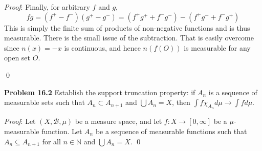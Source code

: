 \documentclass[12pt]{article}
\newcommand{\problem}[1]{\hspace{-4 ex} \large \textbf{Problem #1} }
\renewenvironment{proof}{\hspace{-4 ex} \emph{Proof}:}{\qed}
\newcommand{\NN}{\mathbb{N}}
\newcommand{\BB}{\mathcal{B}}
\begin{document}
\begin{proof}
	Finally, for arbitrary $f$ and $g$, 
	$$
	fg = (f^+ - f^-)(g^+ - g^-) = (f^+g^+ + f^-g^-) - (f^+g^- + f^-g^+)
	$$
	This is simply the finite sum of products of non-negative functions and is thus measurable. There is the small issue of the subtraction. That is easily overcome since $n(x)=-x$ is continuous, and hence $n(f(O))$ is measurable for any open set $O$. 
	
\end{proof}


\bigbreak
\problem{16.2} Establish the support truncation property: if $A_n$ is a sequence of measurable sets such that $A_n\subset A_{n+1}$ and $\bigcup A_n=X$, then $\int f\chi_{A_n} d\mu\to\int f d\mu$.
\bigbreak

\begin{proof}
	Let $(X,\BB,\mu)$ be a measure space, and let $f:X \to [0,\infty]$ be a $\mu$-measurable function. Let $A_n$ be a sequence of measurable functions such that $A_n \subseteq A_{n+1}$ for all $n \in \NN$ and $\bigcup A_n = X$.
\end{proof}
\end{document}
